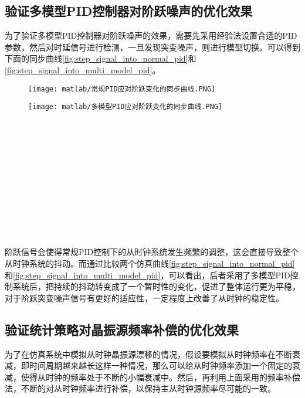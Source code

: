 \subsection{验证多模型PID控制器对阶跃噪声的优化效果}
为了验证多模型PID控制器对阶跃噪声的效果，需要先采用经验法设置合适的PID参数，然后对时延信号进行检测，一旦发现突变噪声，则进行模型切换。可以得到下面的同步曲线\ref{fig:step_signal_into_normal_pid}和\ref{fig:step_signal_into_multi_model_pid}。
\begin{figure}[htbp]
  \centering
  \begin{minipage}[b]{0.7\textwidth}
   \captionstyle{\centering}
   \centering
   \texttt{[image: matlab/常规PID应对阶跃变化的同步曲线.PNG]}
  \end{minipage}     
\end{figure}
\begin{figure}[htbp]
  \centering
  \begin{minipage}[b]{0.7\textwidth}
   \captionstyle{\centering}
   \centering
   \texttt{[image: matlab/多模型PID应对阶跃变化的同步曲线.PNG]}
  \end{minipage}     
\end{figure}
\\ \\ \\ \\ \\ \\ \\ \\ \\ \\ \\ 

阶跃信号会使得常规PID控制下的从时钟系统发生频繁的调整，这会直接导致整个从时钟系统的抖动。而通过比较两个仿真曲线\ref{fig:step_signal_into_normal_pid}和\ref{fig:step_signal_into_multi_model_pid}，可以看出，后者采用了多模型PID控制系统后，把持续的抖动转变成了一个暂时性的变化，促进了整体运行更为平稳，对于阶跃突变噪声信号有更好的适应性，一定程度上改善了从时钟的稳定性。

\subsection{验证统计策略对晶振源频率补偿的优化效果}
为了在仿真系统中模拟从时钟晶振源漂移的情况，假设要模拟从时钟频率在不断衰减，即时间周期越来越长这样一种情况，那么可以给从时钟频率添加一个固定的衰减，使得从时钟的频率处于不断的小幅衰减中。然后，再利用上面采用的频率补偿法，不断的对从时钟频率进行补偿，以保持主从时钟源频率尽可能的一致。

